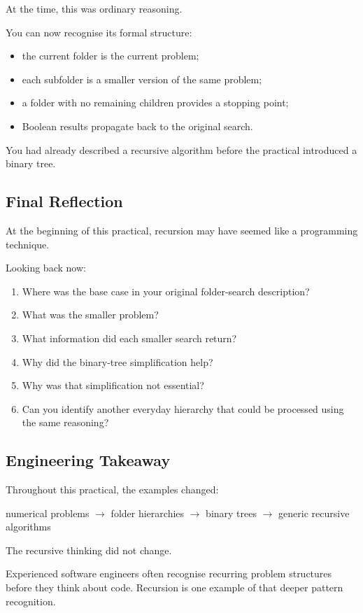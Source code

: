 \documentclass{csc2059practical}
\begin{document}
At the time, this was ordinary reasoning.

You can now recognise its formal structure:

\begin{itemize}
    \item the current folder is the current problem;
    \item each subfolder is a smaller version of the same problem;
    \item a folder with no remaining children provides a stopping point;
    \item Boolean results propagate back to the original search.
\end{itemize}

You had already described a recursive algorithm before the practical introduced
a binary tree.

\subsection{Final Reflection}

\begin{reflectionbox}
At the beginning of this practical, recursion may have seemed like a programming
technique.

Looking back now:

\begin{enumerate}
    \item Where was the base case in your original folder-search description?
    \item What was the smaller problem?
    \item What information did each smaller search return?
    \item Why did the binary-tree simplification help?
    \item Why was that simplification not essential?
    \item Can you identify another everyday hierarchy that could be processed
          using the same reasoning?
\end{enumerate}
\end{reflectionbox}

\subsection{Engineering Takeaway}

\begin{importantnote}
Throughout this practical, the examples changed:

\begin{center}
numerical problems
\(\rightarrow\)
folder hierarchies
\(\rightarrow\)
binary trees
\(\rightarrow\)
generic recursive algorithms
\end{center}

The recursive thinking did not change.

Experienced software engineers often recognise recurring problem structures
before they think about code. Recursion is one example of that deeper pattern
recognition.
\end{importantnote}
\end{document}

